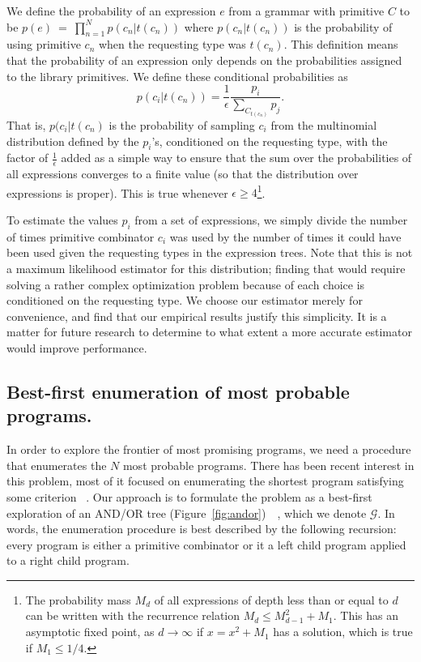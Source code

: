 \documentclass{article}
\begin{document}
We define the probability of an expression $e$ from a grammar with
primitive $C$ to be $p(e)~=~\prod_{n=1}^N p(c_n | t(c_n))$ where
$p(c_n | t(c_n))$ is the probability of using primitive $c_n$ when the
requesting type was $t(c_n)$. This definition means that the
probability of an expression only depends on the probabilities
assigned to the library primitives. We define these conditional
probabilities as
\[
p(c_i | t(c_n)) =    \frac{1}{\epsilon}\frac{p_i}{\sum_{C_{t(c_n)}} p_j}.
\]
That is, $p(c_i | t(c_n)$ is the probability of sampling $c_i$ from
the multinomial distribution defined by the $p_i$'s, conditioned on
the requesting type, with the factor of $\frac{1}{\epsilon}$ added as
a simple way to ensure that the sum over the probabilities of all
expressions converges to a finite value (so that the distribution over
expressions is proper). This is true whenever $\epsilon \geq
4$\footnote{The probability mass $M_d$ of all expressions of depth
  less than or equal to $d$ can be written with the recurrence
  relation $M_d \leq M_{d-1}^2 + M_1$. This has an asymptotic fixed
  point, as $d \rightarrow \infty$ if $x = x^2 + M_1$ has a solution,
  which is true if $M_1 \leq 1/4$.}.

To estimate the values $p_i$ from a set of expressions, we simply divide
the number of times primitive combinator $c_i$ was used by the number
of times it could have been used given the requesting types in the
expression trees. Note that this is not a maximum likelihood estimator
for this distribution; finding that would require solving a rather
complex optimization problem because of each choice is conditioned on
the requesting type. We choose our estimator merely for convenience,
and find that our empirical results justify this simplicity. It is a
matter for future research to determine to what extent a more accurate
estimator would improve performance.

\subsection{Best-first enumeration of most probable programs.}
In order to explore the frontier of most promising programs, we need a
procedure that enumerates the $N$ most probable programs. There has
been recent interest in this problem, most of it focused on
enumerating the shortest program satisfying some
criterion~\cite{DBLP:conf/sfp/Katayama05}
\cite{DBLP:conf/aaip/YakushevJ09}. Our approach is to formulate the
problem as a best-first exploration of an AND/OR tree
(Figure~\ref{fig:andor})~\cite{nilsson1982principles}~\cite{DBLP:journals/cacm/Hall73},
which we denote $\mathcal{G}$. In words, the enumeration procedure is
best described by the following recursion: every program is either a
primitive combinator or it a left child program applied to a right
child program.
\end{document}
